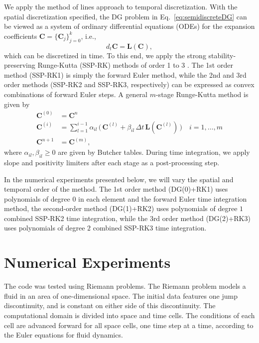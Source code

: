 \documentclass[10pt]{article}
\begin{document}
We apply the method of lines approach to temporal discretization.  
With the spatial discretization specified, the DG problem in Eq.~\eqref{eq:semidiscreteDG} can be viewed as a system of ordinary differential equations (ODEs) for the expansion coefficients $\boldsymbol{C}=\{\boldsymbol{C}_{j}\}_{j=0}^{k}$, i.e.,
\begin{equation}
  d_{t}\boldsymbol{C}
  =\boldsymbol{L}(\boldsymbol{C}),
\end{equation}
which can be discretized in time.  
To this end, we apply the strong stability-preserving Runge-Kutta (SSP-RK) methods of order 1 to 3 \citep{gottlieb_etal_2001}.  
The 1st order method (SSP-RK1) is simply the forward Euler method, while the 2nd and 3rd order methods (SSP-RK2 and SSP-RK3, respectively) can be expressed as convex combinations of forward Euler steps.  
A general $m$-stage Runge-Kutta method is given by
\begin{align}
  \boldsymbol{C}^{(0)}
  &=\boldsymbol{C}^{n} \\
  \boldsymbol{C}^{(i)}
  &=\sum_{l=1}^{i-1}\alpha_{il}\,\big(\,\boldsymbol{C}^{(l)}+\beta_{il}\,\Delta t\,\boldsymbol{L}(\boldsymbol{C}^{(l)})\,\big)
  \quad i=1,\ldots,m \\
  \boldsymbol{C}^{n+1}
  &=\boldsymbol{C}^{(m)},
\end{align}
where $\alpha_{il},\beta_{il}\ge0$ are given by Butcher tables.  
During time integration, we apply slope and positivity limiters after each stage as a post-processing step.  

In the numerical experiments presented below, we will vary the spatial and temporal order of the method.  
The 1st order method (DG(0)+RK1) uses polynomials of degree $0$ in each element and the forward Euler time integration method, the second-order method (DG(1)+RK2) uses polynomials of degree $1$ combined SSP-RK2 time integration, while the 3rd order method (DG(2)+RK3) uses polynomials of degree $2$ combined SSP-RK3 time integration.  

\section{Numerical Experiments}

The code was tested using Riemann problems. The Riemann problem models a fluid in an area of one-dimensional space. The initial data features one jump discontinuity, and is constant on either side of this discontinuity. The computational domain is divided into space and time cells. The conditions of each cell are advanced forward for all space cells, one time step at a time, according to the Euler equations for fluid dynamics. \citep{Leveque2002}
\end{document}
